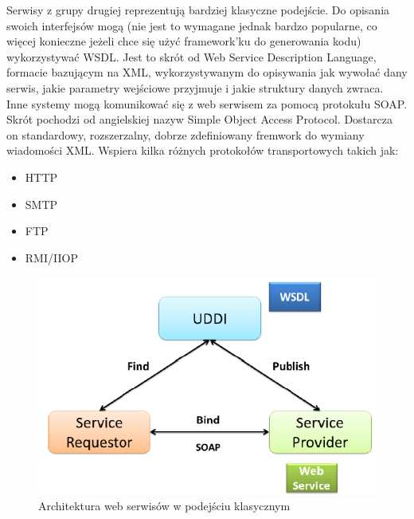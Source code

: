 Serwisy z grupy drugiej reprezentują bardziej klasyczne podejście. Do opisania swoich interfejsów mogą (nie jest to wymagane jednak bardzo popularne, co więcej konieczne jeżeli chce się użyć framework'ku do generowania kodu) wykorzystywać WSDL. Jest to skrót od Web Service Description Language, formacie bazującym na XML, wykorzystywanym do opisywania jak wywołać dany serwis, jakie parametry wejściowe przyjmuje i jakie struktury danych zwraca. Inne systemy mogą komunikować się z web serwisem za pomocą protokułu SOAP. Skrót pochodzi od angielskiej nazyw Simple Object Access Protocol. Dostarcza on standardowy, rozszerzalny, dobrze zdefiniowany fremwork do wymiany wiadomości XML. Wspiera kilka różnych protokołów transportowych takich jak:
 \begin{itemize}
	\item HTTP
	\item SMTP
	\item FTP
	\item RMI/IIOP
\end{itemize}  
\begin{figure}[!h]
	\centering
	\includegraphics[scale=0.75]{webSerwisyArchitektura.png} 
	\caption{Architektura web serwisów w podejściu klasycznym}
\end{figure}

